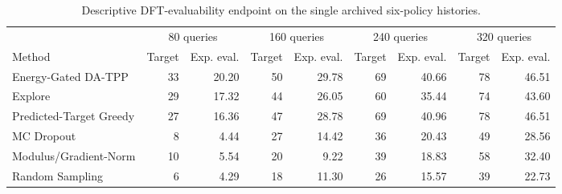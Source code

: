 \begin{table}[H]
\centering
\caption{Descriptive DFT-evaluability endpoint on the single archived
six-policy histories.}
\label{tab:legacy-baselines}
\scriptsize
\begin{tabular}{lrrrrrrrr}
\toprule
& \multicolumn{2}{c}{80 queries} & \multicolumn{2}{c}{160 queries}
& \multicolumn{2}{c}{240 queries} & \multicolumn{2}{c}{320 queries} \\
\cmidrule(lr){2-3}\cmidrule(lr){4-5}\cmidrule(lr){6-7}\cmidrule(lr){8-9}
Method & Target & Exp. eval. & Target & Exp. eval. & Target & Exp. eval. & Target & Exp. eval. \\
\midrule
Energy-Gated DA-TPP & 33 & 20.20 & 50 & 29.78 & 69 & 40.66 & 78 & 46.51 \\
Explore & 29 & 17.32 & 44 & 26.05 & 60 & 35.44 & 74 & 43.60 \\
Predicted-Target Greedy & 27 & 16.36 & 47 & 28.78 & 69 & 40.96 & 78 & 46.51 \\
MC Dropout & 8 & 4.44 & 27 & 14.42 & 36 & 20.43 & 49 & 28.56 \\
Modulus/Gradient-Norm & 10 & 5.54 & 20 & 9.22 & 39 & 18.83 & 58 & 32.40 \\
Random Sampling & 6 & 4.29 & 18 & 11.30 & 26 & 15.57 & 39 & 22.73 \\
\bottomrule
\end{tabular}
\end{table}
